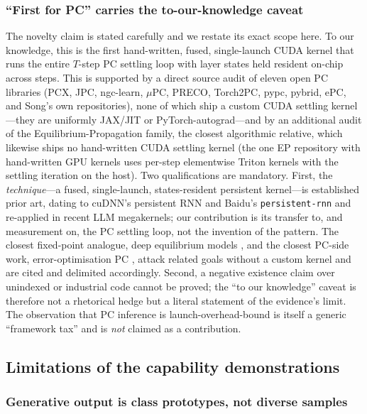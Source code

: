 \subsubsection{``First for PC'' carries the to-our-knowledge caveat}

The novelty claim is stated carefully and we restate its exact scope here. To our
knowledge, this is the first hand-written, fused, single-launch CUDA kernel that runs
the entire $T$-step PC settling loop with layer states held resident on-chip across
steps. This is supported by a direct source audit of eleven open PC libraries (PCX,
JPC, ngc-learn, $\mu$PC, PRECO, Torch2PC, pypc, pybrid, ePC, and Song's own
repositories), none of which ship a custom CUDA settling kernel---they are uniformly
JAX/JIT or PyTorch-autograd---and by an additional audit of the
Equilibrium-Propagation family, the closest algorithmic relative, which likewise
ships no hand-written CUDA settling kernel (the one EP repository with hand-written
GPU kernels uses per-step elementwise Triton kernels with the settling iteration on
the host). Two qualifications are mandatory. First, the \emph{technique}---a fused,
single-launch, states-resident persistent kernel---is established prior art, dating
to cuDNN's persistent RNN and Baidu's \texttt{persistent-rnn}
\citep{diamos2016persistent} and re-applied in recent LLM megakernels; our
contribution is its transfer to, and measurement on, the PC settling loop, not the
invention of the pattern. The closest fixed-point analogue, deep equilibrium models
\citep{bai2019deq}, and the closest PC-side work, error-optimisation PC
\citep{goemaere2025epc}, attack related goals without a custom kernel and are cited
and delimited accordingly. Second, a negative existence claim over unindexed or
industrial code cannot be proved; the ``to our knowledge'' caveat is therefore not
a rhetorical hedge but a literal statement of the evidence's limit. The observation
that PC inference is launch-overhead-bound is itself a generic ``framework tax'' and
is \emph{not} claimed as a contribution.

\subsection{Limitations of the capability demonstrations}

\subsubsection{Generative output is class prototypes, not diverse samples}

